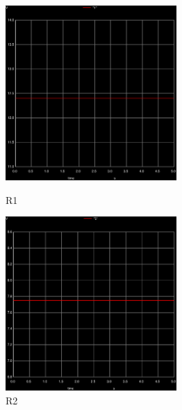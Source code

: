 \documentclass{report}
\begin{document}
\begin{figure}[h]
  \centering
 \includegraphics[width=6.5cm]{011.ps}
 \caption{R1}
 \includegraphics[width=6.5cm]{012.ps}
  \caption{R2}
  \label{2}
\end{figure}

\newpage
\end{document}
